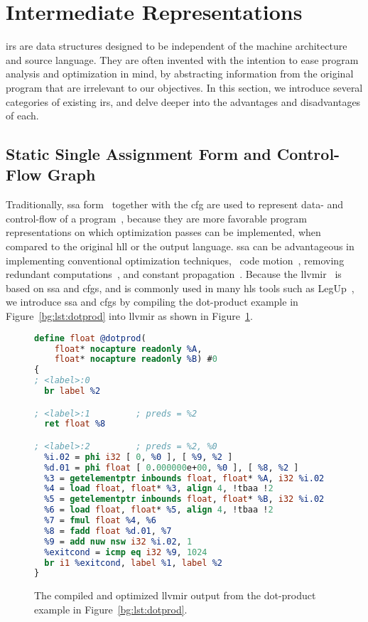 \section{Intermediate Representations}
\label{bg:sec:intermediate}

\Glspl{ir} are data structures designed to be independent of the machine
architecture and source language.  They are often invented with the intention
to ease program analysis and optimization in mind, by abstracting information
from the original program that are irrelevant to our objectives.  In this
section, we introduce several categories of existing \glspl{ir}, and delve
deeper into the advantages and disadvantages of each.

\subsection{Static Single Assignment Form and Control-Flow Graph}
\label{bg:sub:ssa_cfg}

Traditionally, \gls{ssa} form~\cite{alpern88, rau92} together with
the \gls{cfg} are used to represent data- and control-flow of a
program~\cite{cytron91}, because they are more favorable program
representations on which optimization passes can be implemented, when
compared to the original \gls{hll} or the output language.  \Gls{ssa} can be
advantageous in implementing conventional optimization techniques, \eg~code
motion~\cite{cytron86}, removing redundant computations~\cite{rosen88}, and
constant propagation~\cite{cytron91}.  Because the \gls{llvmir}~\cite{llvm_ir}
is based on \gls{ssa} and \glspl{cfg}, and is commonly used in many \gls{hls}
tools such as LegUp~\cite{legup}, we introduce \gls{ssa} and \glspl{cfg}
by compiling the dot-product example in Figure~\ref{bg:lst:dotprod} into
\gls{llvmir} as shown in Figure~\ref{bg:lst:dotprod_ll}.
\begin{figure}[ht]
    \centering
    \begin{lstlisting}[language=LLVM]
define float @dotprod(
    float* nocapture readonly %A,
    float* nocapture readonly %B) #0
{
; <label>:0
  br label %2

; <label>:1         ; preds = %2
  ret float %8

; <label>:2         ; preds = %2, %0
  %i.02 = phi i32 [ 0, %0 ], [ %9, %2 ]
  %d.01 = phi float [ 0.000000e+00, %0 ], [ %8, %2 ]
  %3 = getelementptr inbounds float, float* %A, i32 %i.02
  %4 = load float, float* %3, align 4, !tbaa !2
  %5 = getelementptr inbounds float, float* %B, i32 %i.02
  %6 = load float, float* %5, align 4, !tbaa !2
  %7 = fmul float %4, %6
  %8 = fadd float %d.01, %7
  %9 = add nuw nsw i32 %i.02, 1
  %exitcond = icmp eq i32 %9, 1024
  br i1 %exitcond, label %1, label %2
}
    \end{lstlisting}
    \caption{%
        The compiled and optimized \gls{llvmir} output from the dot-product
        example in Figure~\ref{bg:lst:dotprod}.
    }\label{bg:lst:dotprod_ll}
\end{figure}

